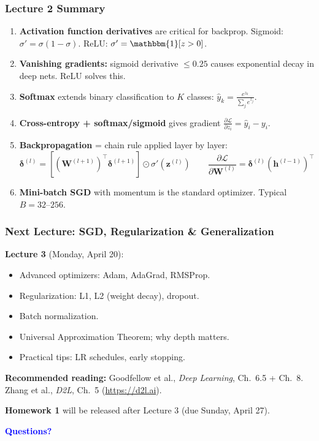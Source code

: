 \documentclass[notes,11pt, aspectratio=169]{beamer}
\newcommand{\vh}{\mathbf{h}}
\newcommand{\vz}{\mathbf{z}}
\newcommand{\vW}{\mathbf{W}}
\newcommand{\pd}[2]{\frac{\partial #1}{\partial #2}}
\begin{document}
\begin{frame}
\frametitle{Lecture 2 Summary}

\begin{enumerate}
    \item \textbf{Activation function derivatives} are critical for backprop. Sigmoid: $\sigma' = \sigma(1-\sigma)$. ReLU: $\sigma' = \mathbbm{1}[z > 0]$.

    \item \textbf{Vanishing gradients:} sigmoid derivative $\leq 0.25$ causes exponential decay in deep nets. ReLU solves this.

    \item \textbf{Softmax} extends binary classification to $K$ classes: $\hat{y}_k = \frac{e^{z_k}}{\sum_j e^{z_j}}$.

    \item \textbf{Cross-entropy + softmax/sigmoid} gives gradient $\pd{\mathcal{L}}{z_i} = \hat{y}_i - y_i$.

    \item \textbf{Backpropagation} = chain rule applied layer by layer:
    \[
        \bm{\delta}^{(l)} = [(\vW^{(l+1)})^\top \bm{\delta}^{(l+1)}] \odot \sigma'(\vz^{(l)}) \qquad \pd{\mathcal{L}}{\vW^{(l)}} = \bm{\delta}^{(l)}(\vh^{(l-1)})^\top
    \]

    \item \textbf{Mini-batch SGD} with momentum is the standard optimizer. Typical $B = 32$--$256$.
\end{enumerate}
\end{frame}

\begin{frame}
\frametitle{Next Lecture: SGD, Regularization \& Generalization}

\textbf{Lecture 3} (Monday, April 20):
\begin{itemize}
    \item Advanced optimizers: Adam, AdaGrad, RMSProp.
    \item Regularization: L1, L2 (weight decay), dropout.
    \item Batch normalization.
    \item Universal Approximation Theorem; why depth matters.
    \item Practical tips: LR schedules, early stopping.
\end{itemize}

\vspace{6pt}
\textbf{Recommended reading:} Goodfellow et al., \textit{Deep Learning}, Ch.\ 6.5 + Ch.\ 8. Zhang et al., \textit{D2L}, Ch.\ 5 (\url{https://d2l.ai}).

\vspace{6pt}
\textbf{Homework 1} will be released after Lecture 3 (due Sunday, April 27).

\vspace{4pt}
\begin{center}
\Large \textcolor{blue}{\textbf{Questions?}}
\end{center}
\end{frame}
\end{document}
